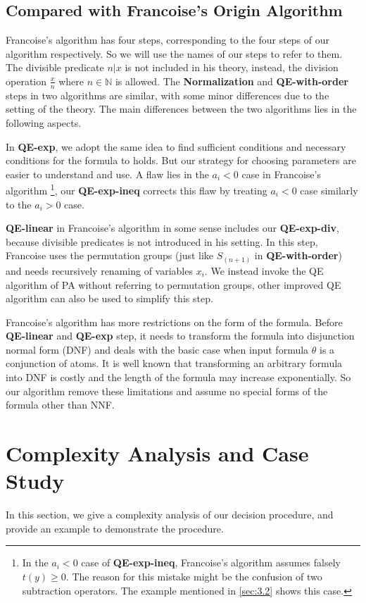 \documentclass[runningheads]{llncs}
\begin{document}
\subsection{Compared with Francoise's Origin Algorithm}

Francoise's algorithm \cite{Francoise} has four steps,
corresponding to the four steps of our algorithm respectively.
So we will use the names of our steps to refer to them. 
The divisible predicate $n|x$ is not included in his theory,
instead, the division operation $\frac{x}{n}$ where $n\in \mathbb{N}$ is allowed.
The \textbf{Normalization} and \textbf{QE-with-order} steps in two algorithms are similar,
with some minor differences due to the setting of the theory.
The main differences between the two algorithms lies in the following aspects.

In \textbf{QE-exp},
we adopt the same idea to find sufficient conditions
and necessary conditions for the formula to holds.
But our strategy for choosing parameters are easier to understand and use.
A flaw lies in the $a_i<0$ case in Francoise's algorithm 
\footnote{
In the $a_i<0$ case of \textbf{QE-exp-ineq},
Francoise's algorithm assumes falsely $t(y)\ge 0$.
The reason for this mistake might be the confusion of 
two subtraction operators.
The example mentioned in \ref{sec:3.2} shows this case.
},
our \textbf{QE-exp-ineq} corrects this flaw by 
treating $a_i<0$ case similarly to the $a_i>0$ case.

\textbf{QE-linear} in Francoise's algorithm in some sense includes our
\textbf{QE-exp-div}, because divisible predicates is not introduced in his setting.
In this step,
Francoise uses the permutation groups (just like $S_{(n+1)}$ in \textbf{QE-with-order}) and needs recursively renaming of variables $x_i$.
We instead invoke the QE algorithm of PA without referring to permutation groups, 
other improved QE algorithm can also be used to simplify this step.

Francoise's algorithm has more restrictions on the form
of the formula.
Before \textbf{QE-linear} and \textbf{QE-exp} step,
it needs to transform the formula into disjunction normal form (DNF)
and deals with the basic case when input formula $\theta$ is 
a conjunction of atoms. 
It is well known that transforming an arbitrary formula into 
DNF is costly and the length of the formula may increase exponentially.
So our algorithm remove these limitations and assume no special forms of
the formula other than NNF.

\section{Complexity Analysis and Case Study}
In this section, we give a complexity analysis of our decision procedure, and provide an example to demonstrate the procedure.
\end{document}
